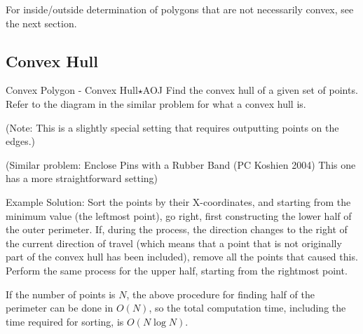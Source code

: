 For inside/outside determination of polygons that are not necessarily convex, see the next section.
\subsection{Convex Hull}

\begin{pbox}{Convex Polygon - Convex Hull$\star$}{AOJ}
Find the convex hull of a given set of points. Refer to the diagram in the similar problem for what a convex hull is.

(Note: This is a slightly special setting that requires outputting points on the edges.)


(Similar problem: Enclose Pins with a Rubber Band (PC Koshien 2004)  This one has a more straightforward setting)
\end{pbox}

Example Solution: Sort the points by their X-coordinates, and starting from the minimum value (the leftmost point), go right, first constructing the lower half of the outer perimeter.
If, during the process, the direction changes to the right of the current direction of travel (which means that a point that is not originally part of the convex hull has been included), remove all the points that caused this. Perform the same process for the upper half, starting from the rightmost point.

If the number of points is $N$, the above procedure for finding half of the perimeter can be done in $O(N)$, so the total computation time, including the time required for sorting, is $O(N\log N)$.

